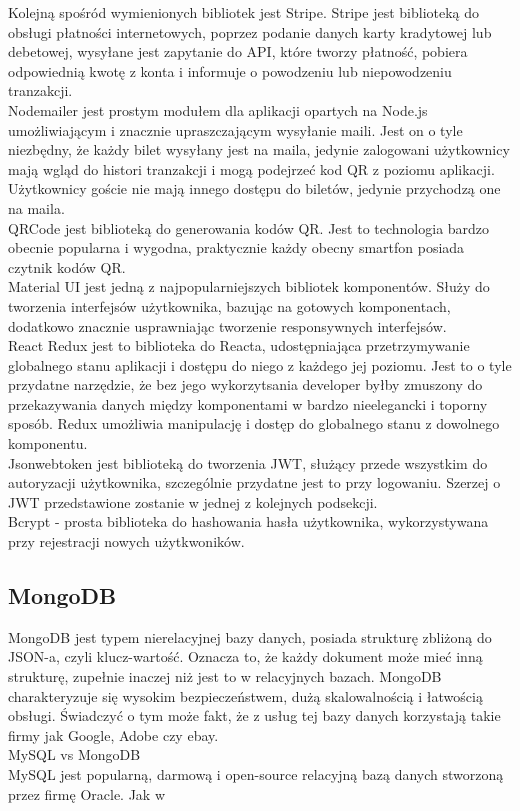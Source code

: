 \documentclass[12pt]{article}
\begin{document}
\begin{sloppypar}
{{    Kolejną spośród wymienionych bibliotek jest Stripe. Stripe jest biblioteką do obsługi płatności internetowych, poprzez podanie danych karty kradytowej lub debetowej, 
    wysyłane jest zapytanie do API, które tworzy płatność, pobiera odpowiednią kwotę z konta i informuje o powodzeniu lub niepowodzeniu tranzakcji.\\

    Nodemailer jest prostym modułem dla aplikacji opartych na Node.js umożliwiającym i znacznie upraszczającym wysyłanie maili. Jest on o tyle niezbędny, że każdy bilet wysyłany jest na maila, 
    jedynie zalogowani użytkownicy mają wgląd do histori tranzakcji i mogą podejrzeć kod QR z poziomu aplikacji. Użytkownicy goście nie mają innego dostępu do biletów, jedynie 
    przychodzą one na maila.\\

    QRCode jest biblioteką do generowania kodów QR. Jest to technologia bardzo obecnie popularna i wygodna, praktycznie każdy obecny smartfon posiada czytnik kodów QR.\\

    Material UI jest jedną z najpopularniejszych bibliotek komponentów. Służy do tworzenia interfejsów użytkownika, bazując na gotowych komponentach, dodatkowo znacznie 
    usprawniając tworzenie responsywnych interfejsów.\\

    React Redux jest to biblioteka do Reacta, udostępniająca przetrzymywanie globalnego stanu aplikacji i dostępu do niego z każdego jej poziomu. Jest to o tyle przydatne 
    narzędzie, że bez jego wykorzytsania developer byłby zmuszony do przekazywania danych między komponentami w bardzo nieelegancki i toporny sposób. Redux umożliwia 
    manipulację i dostęp do globalnego stanu z dowolnego komponentu.\\

    Jsonwebtoken jest biblioteką do tworzenia JWT, służący przede wszystkim do autoryzacji użytkownika, szczególnie przydatne jest to przy logowaniu. Szerzej o JWT 
    przedstawione zostanie w jednej z kolejnych podsekcji.\\

    Bcrypt - prosta biblioteka do hashowania hasła użytkownika, wykorzystywana przy rejestracji nowych użytkwoników.
  }
  \subsection{MongoDB}
  {
    MongoDB jest typem nierelacyjnej bazy danych, posiada strukturę zbliżoną do JSON-a, czyli klucz-wartość. Oznacza to, że każdy dokument może mieć inną strukturę, 
    zupełnie inaczej niż jest to w relacyjnych bazach. MongoDB charakteryzuje się wysokim bezpieczeństwem, dużą skalowalnością i łatwością obsługi. 
    Świadczyć o tym może fakt, że z usług tej bazy danych korzystają takie firmy jak Google, Adobe czy ebay. \\
    MySQL vs MongoDB\\
    MySQL jest popularną, darmową i open-source relacyjną bazą danych stworzoną przez firmę Oracle. Jak w 
  }
}
\end{sloppypar}
\end{document}
